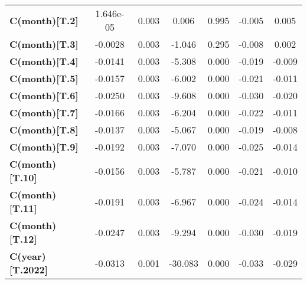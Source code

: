 \begin{center}
\begin{tabular}{lcccccc}
\textbf{C(month)[T.2]}                                                            &    1.646e-05  &        0.003     &     0.006  &         0.995        &       -0.005    &        0.005     \\
\textbf{C(month)[T.3]}                                                            &      -0.0028  &        0.003     &    -1.046  &         0.295        &       -0.008    &        0.002     \\
\textbf{C(month)[T.4]}                                                            &      -0.0141  &        0.003     &    -5.308  &         0.000        &       -0.019    &       -0.009     \\
\textbf{C(month)[T.5]}                                                            &      -0.0157  &        0.003     &    -6.002  &         0.000        &       -0.021    &       -0.011     \\
\textbf{C(month)[T.6]}                                                            &      -0.0250  &        0.003     &    -9.608  &         0.000        &       -0.030    &       -0.020     \\
\textbf{C(month)[T.7]}                                                            &      -0.0166  &        0.003     &    -6.204  &         0.000        &       -0.022    &       -0.011     \\
\textbf{C(month)[T.8]}                                                            &      -0.0137  &        0.003     &    -5.067  &         0.000        &       -0.019    &       -0.008     \\
\textbf{C(month)[T.9]}                                                            &      -0.0192  &        0.003     &    -7.070  &         0.000        &       -0.025    &       -0.014     \\
\textbf{C(month)[T.10]}                                                           &      -0.0156  &        0.003     &    -5.787  &         0.000        &       -0.021    &       -0.010     \\
\textbf{C(month)[T.11]}                                                           &      -0.0191  &        0.003     &    -6.967  &         0.000        &       -0.024    &       -0.014     \\
\textbf{C(month)[T.12]}                                                           &      -0.0247  &        0.003     &    -9.294  &         0.000        &       -0.030    &       -0.019     \\
\textbf{C(year)[T.2022]}                                                          &      -0.0313  &        0.001     &   -30.083  &         0.000        &       -0.033    &       -0.029     \\

\end{tabular}
\end{center}
